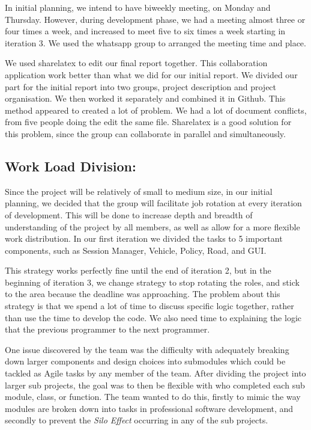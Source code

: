\documentclass[11pt]{article}
\begin{document}
{In initial planning, we intend to have biweekly meeting, on Monday and Thursday. However, during development phase, we had a meeting almost three or four times a week, and increased to meet five to six times a week starting in iteration 3. We used the whatsapp group to arranged the meeting time and place. 

We used sharelatex to edit our final report together. This collaboration application work better than what we did for our initial report. We divided our part for the initial report into two groups, project description and project organisation. We then worked it separately and combined it in Github. This method appeared to created a lot of problem. We had a lot of document conflicts, from five people doing the edit the same file. Sharelatex is a good solution for this problem, since the group can collaborate in parallel and simultaneously. 

\subsection{Work Load Division:}
Since the project will be relatively of small to medium size, in our initial planning, we decided that the group will facilitate job rotation at every iteration of development. This will be done to increase depth and breadth of understanding of the project by all members, as well as allow for a more flexible work distribution. In our first iteration we divided the tasks to 5 important components, such as Session Manager, Vehicle, Policy, Road, and GUI.

This strategy works perfectly fine until the end of iteration 2, but in the beginning of iteration 3, we change strategy to stop rotating the roles, and stick to the area because the deadline was approaching. The problem about this strategy is that we spend a lot of time to discuss specific logic together, rather than use the time to develop the code. We also need time to explaining the logic that the previous programmer to the next programmer. 

One issue discovered by the team was the difficulty with adequately breaking down larger components and design choices into submodules which could be tackled as Agile tasks by any member of the team. After dividing the project into larger sub projects, the goal was to then be flexible with who completed each sub module, class, or function. The team wanted to do this, firstly to mimic the way modules are broken down into tasks in professional software development, and secondly to prevent the \textit{Silo Effect} occurring in any of the sub projects. 
	
}
\end{document}
